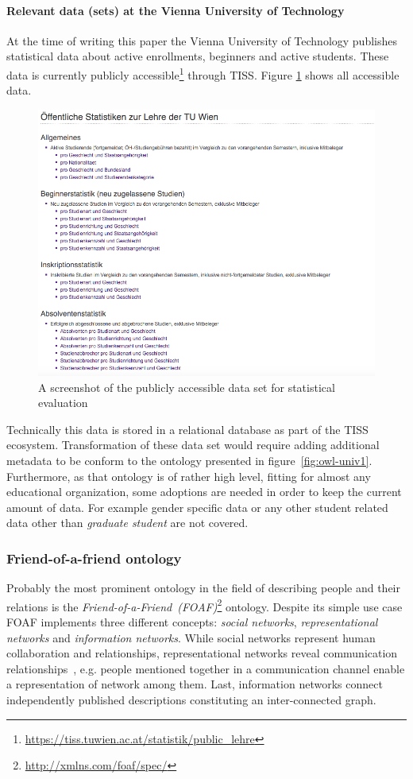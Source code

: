 \documentclass{article}
\begin{document}
\paragraph{Relevant data (sets) at the Vienna University of Technology}
At the time of writing this paper the Vienna University of Technology publishes statistical data about active enrollments, beginners and active students. These data is currently publicly accessible\footnote{\url{https://tiss.tuwien.ac.at/statistik/public_lehre}} through TISS. Figure \ref{fig:tiss-statistic} shows all accessible data.
\begin{figure}[H]
	\centering \includegraphics*[width=.8\columnwidth]{tiss-statistical-data.png}
	\caption{A screenshot of the publicly accessible data set for statistical evaluation}
	\label{fig:tiss-statistic}
\end{figure}
Technically this data is stored in a relational database as part of the TISS ecosystem. Transformation of these data set would require adding additional metadata to be conform to the ontology presented in figure~\ref{fig:owl-univ1}. Furthermore, as that ontology is of rather high level, fitting for almost any educational organization, some adoptions are needed in order to keep the current amount of data. For example gender specific data or any other student related data other than \textit{graduate student} are not covered. 

\subsubsection{Friend-of-a-friend ontology}
Probably the most prominent ontology in the field of describing people and their relations is the \textit{Friend-of-a-Friend~(FOAF)}\footnote{\url{http://xmlns.com/foaf/spec/}} ontology. Despite its simple use case FOAF implements three different concepts: \textit{social networks}, \textit{representational networks} and \textit{information networks}. 
While social networks represent human collaboration and relationships, representational networks reveal communication relationships~\cite{book:encyclopedia-social-network}, e.g. people mentioned together in a communication channel enable a representation of network among them. Last, information networks connect independently published descriptions constituting an inter-connected graph.
\end{document}
